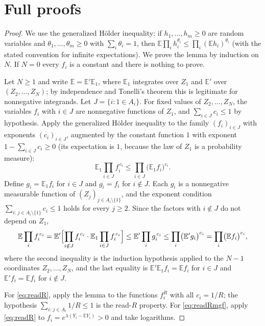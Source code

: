 \documentclass[11pt,a4paper]{article}
\theoremstyle{plain}
\theoremstyle{definition}
\theoremstyle{remark}
\newcommand{\EE}{\mathbb E}
\begin{document}
\appendix

\section{Full proofs}\label{app:proofs}

\label{pf:finner}
\lemfinner*
\begin{proof}
We use the generalized H\"older inequality: if $h_1,\dots,h_m\ge0$ are random variables and $\theta_1,\dots,\theta_m\ge0$ with $\sum_i\theta_i=1$, then $\EE\prod_i h_i^{\theta_i}\le\prod_i(\EE h_i)^{\theta_i}$ (with the stated convention for infinite expectations). We prove the lemma by induction on $N$. If $N=0$ every $f_i$ is a constant and there is nothing to prove.

Let $N\ge1$ and write $\EE=\EE'\EE_1$, where $\EE_1$ integrates over $Z_1$ and $\EE'$ over $(Z_2,\dots,Z_N)$; by independence and Tonelli's theorem this is legitimate for nonnegative integrands. Let $J=\{i:1\in A_i\}$. For fixed values of $Z_2,\dots,Z_N$, the variables $f_i$ with $i\in J$ are nonnegative functions of $Z_1$, and $\sum_{i\in J}c_i\le1$ by hypothesis. Apply the generalized H\"older inequality to the family $(f_i)_{i\in J}$ with exponents $(c_i)_{i\in J}$, augmented by the constant function $1$ with exponent $1-\sum_{i\in J}c_i\ge0$ (its expectation is $1$, because the law of $Z_1$ is a probability measure):
\[
 \EE_1\prod_{i\in J}f_i^{\,c_i}\le\prod_{i\in J}\bigl(\EE_1 f_i\bigr)^{c_i}.
\]
Define $g_i=\EE_1 f_i$ for $i\in J$ and $g_i=f_i$ for $i\notin J$. Each $g_i$ is a nonnegative measurable function of $(Z_j)_{j\in A_i\setminus\{1\}}$, and the exponent condition $\sum_{i:\,j\in A_i\setminus\{1\}}c_i\le1$ holds for every $j\ge2$. Since the factors with $i\notin J$ do not depend on $Z_1$,
\[
 \EE\prod_i f_i^{\,c_i}=\EE'\Bigl[\prod_{i\notin J}f_i^{\,c_i}\cdot\EE_1\prod_{i\in J}f_i^{\,c_i}\Bigr]\le\EE'\prod_i g_i^{\,c_i}\le\prod_i\bigl(\EE' g_i\bigr)^{c_i}=\prod_i\bigl(\EE f_i\bigr)^{c_i},
\]
where the second inequality is the induction hypothesis applied to the $N-1$ coordinates $Z_2,\dots,Z_N$, and the last equality is $\EE'\EE_1 f_i=\EE f_i$ for $i\in J$ and $\EE' f_i=\EE f_i$ for $i\notin J$.

For \eqref{eq:readR}, apply the lemma to the functions $f_i^R$ with all $c_i=1/R$; the hypothesis $\sum_{i:\,j\in A_i}1/R\le1$ is the read-$R$ property. For \eqref{eq:readRmgf}, apply \eqref{eq:readR} to $f_i=e^{\lambda(Y_i-\EE Y_i)}>0$ and take logarithms.
\end{proof}
\end{document}
